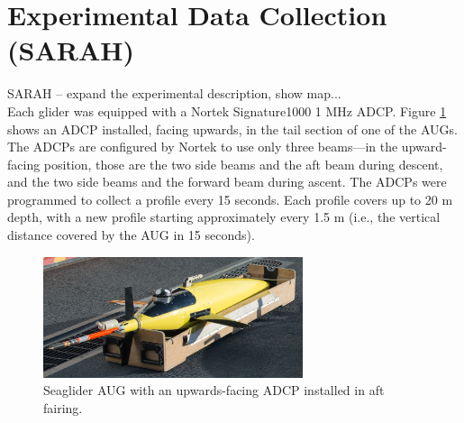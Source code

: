 \section{Experimental Data Collection \textbf(SARAH)}
 
SARAH -- expand the experimental description, show map...
\\

Each glider was equipped with a Nortek Signature1000 1 MHz ADCP. Figure \ref{fig.SG} shows an ADCP installed, facing upwards, in the tail section of one of the AUGs. The ADCPs are configured by Nortek to use only three beams---in the upward-facing position, those are the two side beams and the aft beam during descent, and the two side beams and the forward beam during ascent. The ADCPs were programmed to collect a profile every 15 seconds. Each profile covers up to 20 m depth, with a new profile starting approximately every 1.5 m (i.e., the vertical distance covered by the AUG in 15 seconds).
 
 
\begin{figure}[!ht]
  \centering
  \includegraphics[width=3.0in]{./figs/Gliders_hires-99_crop.jpg}
  \caption{Seaglider AUG with an upwards-facing ADCP installed in aft fairing.}
  \label{fig.SG}
  \vspace{-0.2in}
\end{figure}
